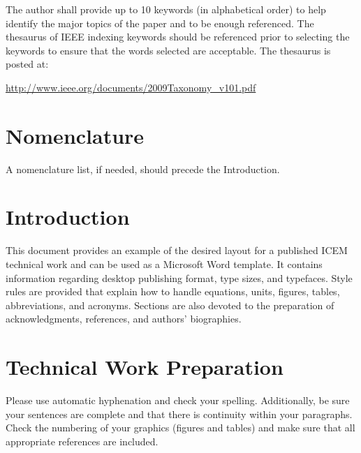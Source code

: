 \documentclass[a4paper]{IEEEtran}
\begin{document}
\begin{IEEEkeywords}
The author shall provide up to 10 keywords (in alphabetical order) to help identify the major topics of the paper and to be enough referenced. The thesaurus of IEEE indexing keywords should be referenced prior to selecting the keywords to ensure that the words selected are acceptable. 
The thesaurus is posted at: 

\url{http://www.ieee.org/documents/2009Taxonomy_v101.pdf}
\end{IEEEkeywords}



%

\section{Nomenclature}
A nomenclature list, if needed, should precede the Introduction.

\section{Introduction}
This document provides an example of the desired layout for a published ICEM technical work and can be used as a Microsoft Word template. 
It contains information regarding desktop publishing format, type sizes, and typefaces. Style rules are provided that explain how to handle equations, units, 
figures, tables, abbreviations, and acronyms. Sections are also devoted to the preparation of acknowledgments, references, and authors’ biographies.
\section{Technical Work Preparation}
Please use automatic hyphenation and check your spelling. Additionally, be sure your sentences are complete and that there is continuity within your paragraphs. 
Check the numbering of your graphics (figures and tables) and make sure that all appropriate references are included.
\end{document}
